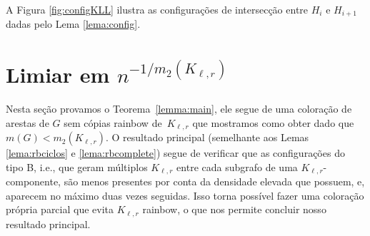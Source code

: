 \documentclass[11pt,twoside,a4paper]{book}
\newcommand{\K}{K_{\ell,r}} %
\theoremstyle{note}
\begin{document}
  A Figura \ref{fig:configKLL} ilustra as configurações de intersecção entre $H_i$ e $H_{i+1}$ dadas pelo Lema \ref{lema:config}.

\section{Limiar em $n^{-1/m_2(K_{\ell,r})}$}
\label{sec:mainres}

Nesta seção provamos o Teorema~\ref{lemma:main}, ele segue 
de uma coloração de arestas de $G$ sem cópias rainbow de~$\K$ que mostramos como obter dado que $m(G) < m_2(\K)$.
O resultado principal (semelhante aos Lemas \ref{lema:rbciclos} e \ref{lema:rbcomplete}) segue de verificar que as configurações do tipo B, i.e., que geram múltiplos $\K$ entre cada subgrafo de uma $\K$-componente, são menos presentes por conta da densidade elevada que possuem, e, aparecem no máximo duas vezes seguidas. 
  Isso torna possível fazer uma coloração própria parcial  que evita $\K$ rainbow, o que nos permite concluir nosso resultado principal.
  
\end{document}
